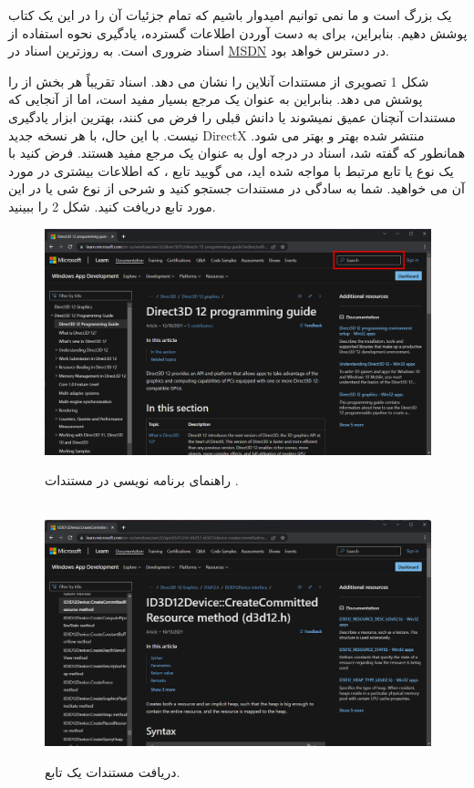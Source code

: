 {
    \Large
     یک  بزرگ است و ما نمی توانیم امیدوار باشیم که تمام جزئیات آن را در این یک کتاب پوشش دهیم.
    بنابراین، برای به دست آوردن اطلاعات گسترده، یادگیری نحوه استفاده از اسناد  ضروری است.
    به روزترین اسناد در \href{https://msdn.microsoft.com/en-us/library/windows/desktop/dn899121%28v=vs.85%29.aspx}{MSDN}
    در دسترس خواهد بود.

    شکل 1 تصویری از مستندات آنلاین را نشان می دهد.
    اسناد  تقریباً هر بخش از  را پوشش می دهد.
    بنابراین به عنوان یک مرجع بسیار مفید است، اما از آنجایی که مستندات آنچنان عمیق نمیشوند یا دانش قبلی را فرض می کنند، بهترین ابزار یادگیری نیست. با این حال، با هر نسخه جدید DirectX منتشر شده بهتر و بهتر می شود.
    همانطور که گفته شد، اسناد در درجه اول به عنوان یک مرجع مفید هستند.
    فرض کنید با یک نوع یا تابع مرتبط با  مواجه شده اید، می گویید تابع ، که اطلاعات بیشتری در مورد آن می خواهید.
    شما به سادگی در مستندات جستجو کنید و شرحی از نوع شی یا در این مورد تابع دریافت کنید. شکل 2 را ببینید.
    \begin{figure}[H]
        \centering
        \setlength{\belowcaptionskip}{-10pt}
        \includegraphics[width=\textwidth]{Images/1.Intro.1.1.png}
        \caption{راهنمای برنامه نویسی  در مستندات .}
        \\[20pt]
        \includegraphics[width=\textwidth]{Images/1.Intro.1.2.png}
        \caption{دریافت مستندات یک تابع.}
    \end{figure}

}
